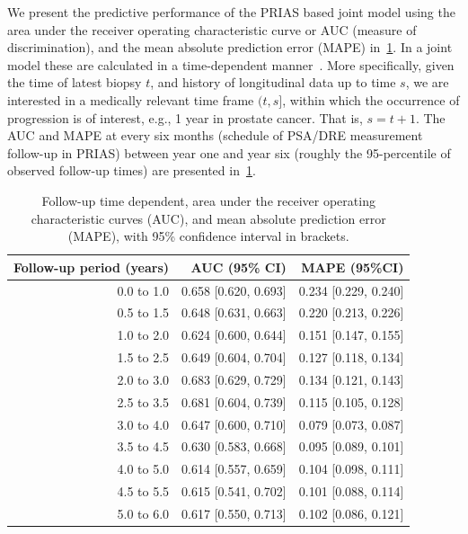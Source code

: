 We present the predictive performance of the PRIAS based joint model using the area under the receiver operating characteristic curve or AUC (measure of discrimination), and the mean absolute prediction error (MAPE) in~\ref{tab:AUC_PE}. In a joint model these are calculated in a time-dependent manner~\citep{landmarking2017}. More specifically, given the time of latest biopsy $t$, and history of longitudinal data up to time $s$, we are interested in a medically relevant time frame $(t, s]$, within which the occurrence of progression is of interest, e.g., 1 year in prostate cancer. That is, $s = t+1$. The AUC and MAPE at every six months (schedule of PSA/DRE measurement follow-up in PRIAS) between year one and year six (roughly the 95-percentile of observed follow-up times) are presented in~\ref{tab:AUC_PE}.

\begin{table}[!htb]
\begin{center}
\caption{Follow-up time dependent, area under the receiver operating characteristic curves (AUC), and mean absolute prediction error (MAPE), with 95\% confidence interval in brackets.}
\label{tab:AUC_PE}
\begin{tabular}{r|r|r}
\hline
\hline
Follow-up period (years) & AUC (95\% CI) & MAPE (95\%CI)\\ 
\hline
0.0 to 1.0 & 0.658 [0.620, 0.693] & 0.234 [0.229, 0.240]\\
0.5 to 1.5 & 0.648 [0.631, 0.663] & 0.220 [0.213, 0.226]\\
1.0 to 2.0 & 0.624 [0.600, 0.644] & 0.151 [0.147, 0.155]\\
1.5 to 2.5 & 0.649 [0.604, 0.704] & 0.127 [0.118, 0.134]\\
2.0 to 3.0 & 0.683 [0.629, 0.729] & 0.134 [0.121, 0.143]\\
2.5 to 3.5 & 0.681 [0.604, 0.739] & 0.115 [0.105, 0.128]\\
3.0 to 4.0 & 0.647 [0.600, 0.710] & 0.079 [0.073, 0.087]\\
3.5 to 4.5 & 0.630 [0.583, 0.668] & 0.095 [0.089, 0.101]\\
4.0 to 5.0 & 0.614 [0.557, 0.659] & 0.104 [0.098, 0.111]\\
4.5 to 5.5 & 0.615 [0.541, 0.702] & 0.101 [0.088, 0.114]\\
5.0 to 6.0 & 0.617 [0.550, 0.713] & 0.102 [0.086, 0.121]\\
\hline
\end{tabular}	
\end{center}
\end{table}